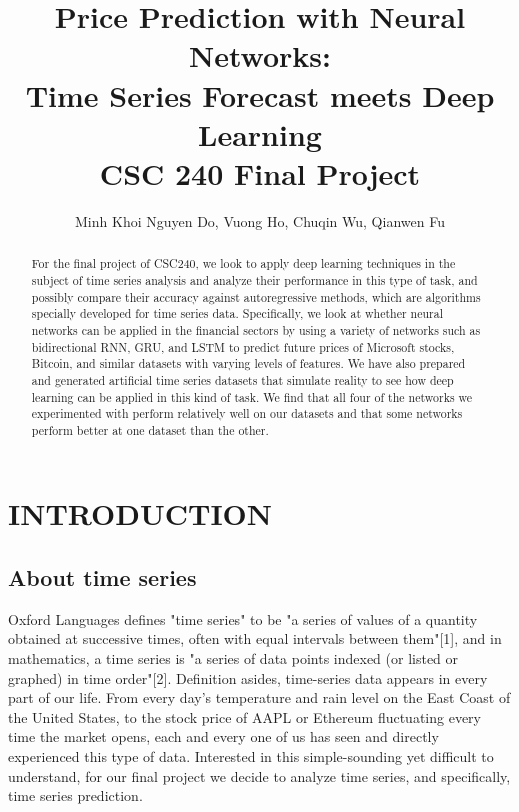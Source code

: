 \documentclass[letterpaper, 10 pt, conference]{ieeeconf}  %
\title{\LARGE
\textbf{Price Prediction with Neural Networks:\\ Time Series Forecast meets Deep Learning}\\
\Large
CSC 240 Final Project
}
\author{Minh Khoi Nguyen Do, Vuong Ho, Chuqin Wu, Qianwen Fu}
\begin{document}
\maketitle
\thispagestyle{empty}
\pagestyle{empty}


\begin{abstract}
    For the final project of CSC240, we look to apply deep learning techniques in the subject of time series analysis and analyze their performance in this type of task, and possibly compare their accuracy against autoregressive methods, which are algorithms specially developed for time series data. Specifically, we look at whether neural networks can be applied in the financial sectors by using a variety of networks such as bidirectional RNN, GRU, and LSTM to predict future prices of Microsoft stocks, Bitcoin, and similar datasets with varying levels of features. We have also prepared and generated artificial time series datasets that simulate reality to see how deep learning can be applied in this kind of task. We find that all four of the networks we experimented with perform relatively well on our datasets and that some networks perform better at one dataset than the other. 

\end{abstract}


\section{INTRODUCTION}
\subsection{About time series}
    Oxford Languages defines "time series" to be "a series of values of a quantity obtained at successive times, often with equal intervals between them"[1], and in mathematics, a time series is "a series of data points indexed (or listed or graphed) in time order"[2]. Definition asides, time-series data appears in every part of our life. From every day's temperature and rain level on the East Coast of the United States, to the stock price of AAPL or Ethereum fluctuating every time the market opens, each and every one of us has seen and directly experienced this type of data. Interested in this simple-sounding yet difficult to understand, for our final project we decide to analyze time series, and specifically, time series prediction.
\end{document}
